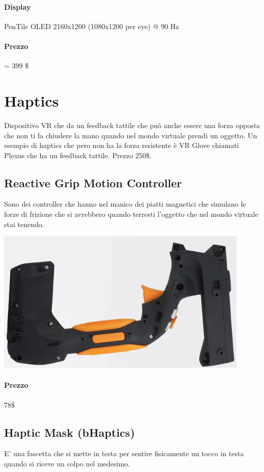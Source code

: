 \documentclass[8pt]{extarticle}
\begin{document}
\begin{multicols}{3}
\paragraph{Display} PenTile OLED 2160x1200 (1080x1200 per eye) @ 90 Hz
\paragraph{Prezzo} $\sim$ 399 \$

\section{Haptics}
Dispositivo VR che da un feedback tattile che può anche essere una forza opposta che non ti fa chiudere la mano quando nel mondo virtuale prendi un oggetto.
Un esempio di haptics che pero non ha la forza resistente è VR Glove chiamati Plexus che ha un feedback tattile. Prezzo 250\$.
\subsection{Reactive Grip Motion Controller}
Sono dei controller che hanno nel manico dei piatti magnetici che simulano le forze di frizione che si avrebbero quando terresti l'oggetto che nel mondo virtuale stai tenendo.
\begin{center}
    \begin{minipage}{0.5\columnwidth}
        \includegraphics[width=\columnwidth]{reactiveGrip.png}
    \end{minipage}
\end{center}
\paragraph{Prezzo} 78\$
\subsection{Haptic Mask (bHaptics)}
E' una fascetta che si mette in testa per sentire fisicamente un tocco in testa quando si riceve un colpo nel medesimo.

\end{multicols}
\end{document}
